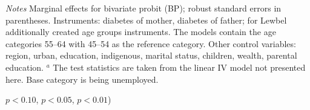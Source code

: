 \begin{table}[ph]
\begin{center}
\begin{adjustbox}{max width=\textwidth, center}
\begin{threeparttable}
{\begin{tablenotes}
\item \textit{Notes}  Marginal effects for bivariate probit (BP); robust standard errors in parentheses. Instruments: diabetes of mother, diabetes of father; for Lewbel additionally created age groups instruments. The models contain the age categories 55--64 with 45--54 as the reference category. Other control variables: region, urban, education, indigenous, marital status, children, wealth, parental education. $^a$ The test statistics are taken from the linear IV model not presented here. Base category is being unemployed.
\item \sym{*} \(p<0.10\), \sym{**} \(p<0.05\), \sym{***} \(p<0.01\))
\end{tablenotes}
}
\end{threeparttable}
\end{adjustbox}
\end{center}
\end{table}


\clearpage


